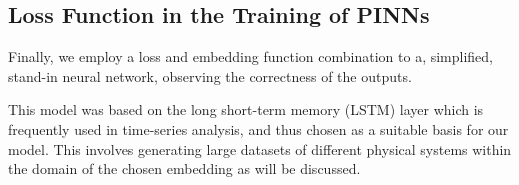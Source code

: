 \subsection{Loss Function in the Training of PINNs}

Finally, we employ a loss and embedding function combination to a, simplified, stand-in neural network, observing the correctness of the outputs.

This model was based on the long short-term memory (LSTM) layer \cite{hochreiterLongShortTermMemory1997} which is frequently used in time-series analysis, and thus chosen as a suitable basis for our model. This involves generating large datasets of different physical systems within the domain of the chosen embedding as will be discussed.
